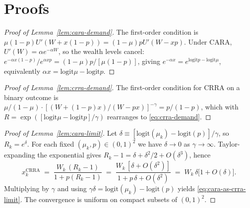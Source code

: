 \documentclass[12pt,letterpaper]{article}
\theoremstyle{definition}
\theoremstyle{remark}
\newcommand{\logit}{\mathrm{logit}}
\newcommand{\1}{\mathbf{1}}
\begin{document}



\appendix

\section{Proofs}\label{app:proofs}

\begin{proof}[Proof of Lemma~\ref{lem:cara-demand}]
The first-order condition is
$\mu(1-p)U'(W+x(1-p)) = (1-\mu)pU'(W-xp)$. Under CARA,
$U'(W)=\alpha e^{-\alpha W}$, so the wealth levels cancel:
$e^{-\alpha x(1-p)}/e^{\alpha xp} = (1-\mu)p/[\mu(1-p)]$, giving
$e^{-\alpha x}=e^{\logit p - \logit\mu}$, equivalently
$\alpha x=\logit\mu-\logit p$.
\end{proof}

\begin{proof}[Proof of Lemma~\ref{lem:crra-demand}]
The first-order condition for CRRA on a binary outcome is
$\mu/(1-\mu)\cdot[(W+(1-p)x)/(W-px)]^{-\gamma}=p/(1-p)$, which with
$R=\exp([\logit\mu-\logit p]/\gamma)$ rearranges to \eqref{eq:crra-demand}.
\end{proof}

\begin{proof}[Proof of Lemma~\ref{lem:cara-limit}]
Let $\delta\equiv [\logit(\mu_{k})-\logit(p)]/\gamma$, so $R_{k}=e^{\delta}$.
For each fixed $(\mu_{k},p)\in(0,1)^{2}$ we have $\delta\to 0$ as
$\gamma\to\infty$. Taylor-expanding the exponential gives
$R_{k}-1=\delta+\delta^{2}/2+O(\delta^{3})$, hence
\[
   x_{k}^{\mathrm{CRRA}}
   \;=\; \frac{W_{k}\,(R_{k}-1)}{1+p(R_{k}-1)}
   \;=\; \frac{W_{k}\,[\delta+O(\delta^{2})]}{1+p\,\delta+O(\delta^{2})}
   \;=\; W_{k}\,\delta\bigl[1+O(\delta)\bigr].
\]
Multiplying by $\gamma$ and using $\gamma\delta=\logit(\mu_{k})-\logit(p)$
yields \eqref{eq:cara-as-crra-limit}. The convergence is uniform on
compact subsets of $(0,1)^{2}$.
\end{proof}
\end{document}
